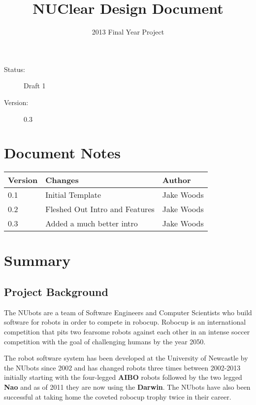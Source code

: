 \documentclass[english,12pt]{scrartcl}
\title{NUClear Design Document}
\author{2013 Final Year Project}
\begin{document}
	\maketitle
	\vfill
	{\large
		\begin{description}
			\item [Status:] Draft 1
			\item [Version:] 0.3
		\end{description}}

	\clearpage
	\tableofcontents

	\section{Document Notes}
		\begin{tabular}{ p{} | p{} | p{} }
			\textbf{Version} & \textbf{Changes} & \textbf{Author} \\
			\hline

			0.1 &
			Initial Template &
			Jake Woods \\
			\hline

			0.2 &
			Fleshed Out Intro and Features &
			Jake Woods \\
			\hline
			
			0.3 &
			Added a much better intro &
			Jake Woods \\
			\hline
		\end{tabular}
		
	\clearpage
		
	\section{Summary}
		\subsection{Project Background}
			The NUbots are a team of Software Engineers and Computer Scientists who build software for robots in order to compete in robocup. 
			Robocup is an international competition that pits two fearsome robots against each other in an intense soccer competition with the goal of challenging humans by the year 2050.
			
			The robot software system has been developed at the University of Newcastle by the NUbots since 2002 and has changed robots three times between 2002-2013 initially starting with the four-legged \textbf{AIBO} robots followed by the two legged \textbf{Nao} and as of 2011 they are now using the \textbf{Darwin}. The NUbots have also been successful at taking home the coveted robocup trophy twice in their career.
			
\end{document}
